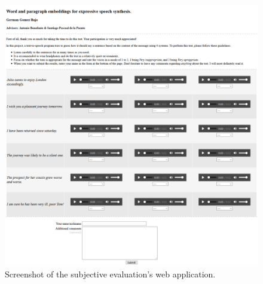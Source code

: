 \begin{figure}
    \centering
    \includegraphics[width=16cm]{figures/webapp}
    \caption{Screenshot of the subjective evaluation's web application.}
    \label{fig:webapp}
\end{figure}
